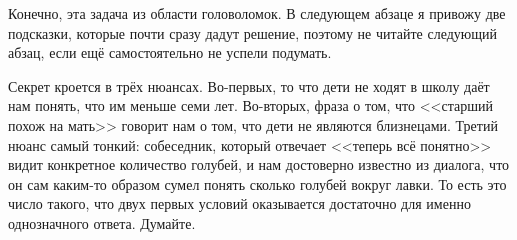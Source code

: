 Конечно, эта задача из области головоломок. В следующем абзаце я привожу две подсказки, которые почти сразу дадут решение, поэтому не читайте следующий абзац, если ещё самостоятельно не успели подумать.

Секрет кроется в трёх нюансах. Во-первых, то что дети не ходят в школу даёт нам понять, что им меньше семи лет. Во-вторых, фраза о том, что <<старший похож на мать>> говорит нам о том, что дети не являются близнецами. Третий нюанс самый тонкий: собеседник, который отвечает <<теперь всё понятно>> видит конкретное количество голубей, и нам достоверно известно из диалога, что он сам каким-то образом сумел понять сколько голубей вокруг лавки. То есть это число такого, что двух первых условий оказывается достаточно для именно однозначного ответа. Думайте.
